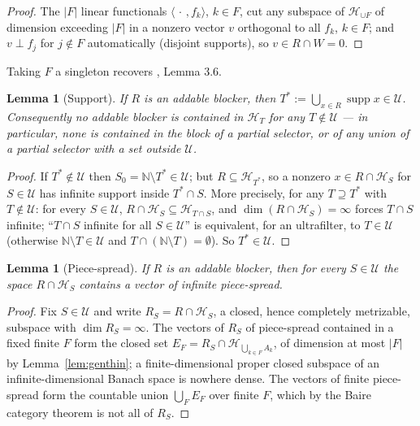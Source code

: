 \documentclass[11pt]{article}
\newtheorem{lemma}[theorem]{Lemma}
\theoremstyle{definition}
\newcommand{\N}{\mathbb{N}}
\newcommand{\HH}{\mathcal{H}}
\newcommand{\U}{\mathcal{U}}
\newcommand{\supp}{\operatorname{supp}}
\begin{document}
\begin{proof}
The $|F|$ linear functionals $\langle\,\cdot\,,f_k\rangle$, $k\in F$,
cut any subspace of $\HH_{\cup F}$ of dimension exceeding $|F|$ in a
nonzero vector $v$ orthogonal to all $f_k$, $k\in F$; and $v\perp f_j$
for $j\notin F$ automatically (disjoint supports), so
$v\in R\cap W=0$.
\end{proof}

Taking $F$ a singleton recovers \cite{FWII}, Lemma 3.6.

\begin{lemma}[Support]\label{lem:support}
If $R$ is an addable blocker, then
$T^*:=\bigcup_{x\in R}\supp x\in\U$. Consequently no addable blocker is
contained in $\HH_T$ for any $T\notin\U$ --- in particular, none is
contained in the block of a partial selector, or of any union of a
partial selector with a set outside $\U$.
\end{lemma}

\begin{proof}
If $T^*\notin\U$ then $S_0=\N\setminus T^*\in\U$; but
$R\subseteq\HH_{T^*}$, so a nonzero $x\in R\cap\HH_{S}$ for
$S\in\U$ has infinite support inside $T^*\cap S$. More precisely, for
any $T\supseteq T^*$ with $T\notin\U$: for every $S\in\U$,
$R\cap\HH_S\subseteq\HH_{T\cap S}$, and $\dim(R\cap\HH_S)=\infty$
forces $T\cap S$ infinite; ``$T\cap S$ infinite for all $S\in\U$'' is
equivalent, for an ultrafilter, to $T\in\U$ (otherwise
$\N\setminus T\in\U$ and $T\cap(\N\setminus T)=\emptyset$). So
$T^*\in\U$.
\end{proof}

\begin{lemma}[Piece-spread]\label{lem:spread}
If $R$ is an addable blocker, then for every $S\in\U$ the space
$R\cap\HH_S$ contains a vector of infinite piece-spread.
\end{lemma}

\begin{proof}
Fix $S\in\U$ and write $R_S=R\cap\HH_S$, a closed, hence completely
metrizable, subspace with $\dim R_S=\infty$. The vectors of $R_S$ of
piece-spread contained in a fixed finite $F$ form the closed set
$E_F=R_S\cap\HH_{\bigcup_{k\in F}A_k}$, of dimension at most $|F|$ by
Lemma~\ref{lem:genthin}; a finite-dimensional proper closed subspace of
an infinite-dimensional Banach space is nowhere dense. The vectors of
finite piece-spread form the countable union $\bigcup_F E_F$ over
finite $F$, which by the Baire category theorem is not all of $R_S$.
\end{proof}
\end{document}

